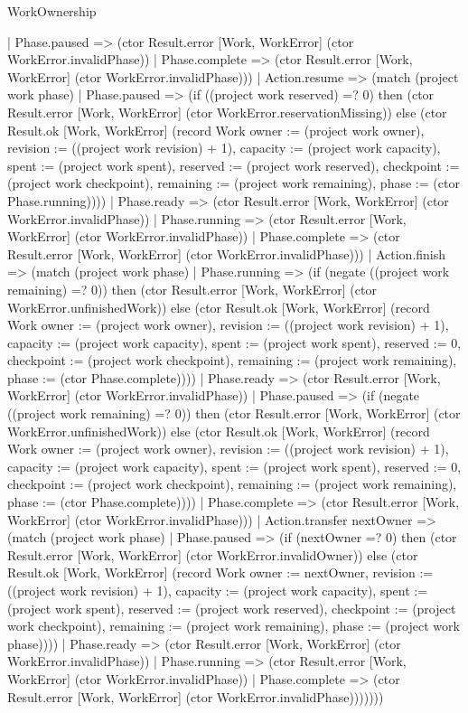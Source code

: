 \begin{lexlean}{WorkOwnership}
\begin{semanticmodule}
{      | Phase.paused => (ctor Result.error [Work, WorkError] (ctor WorkError.invalidPhase))
      | Phase.complete => (ctor Result.error [Work, WorkError] (ctor WorkError.invalidPhase)))
    | Action.resume => (match (project work phase)
      | Phase.paused => (if ((project work reserved) =? 0) then (ctor Result.error [Work, WorkError] (ctor WorkError.reservationMissing)) else (ctor Result.ok [Work, WorkError] (record Work {owner := (project work owner), revision := ((project work revision) + 1), capacity := (project work capacity), spent := (project work spent), reserved := (project work reserved), checkpoint := (project work checkpoint), remaining := (project work remaining), phase := (ctor Phase.running)})))
      | Phase.ready => (ctor Result.error [Work, WorkError] (ctor WorkError.invalidPhase))
      | Phase.running => (ctor Result.error [Work, WorkError] (ctor WorkError.invalidPhase))
      | Phase.complete => (ctor Result.error [Work, WorkError] (ctor WorkError.invalidPhase)))
    | Action.finish => (match (project work phase)
      | Phase.running => (if (negate ((project work remaining) =? 0)) then (ctor Result.error [Work, WorkError] (ctor WorkError.unfinishedWork)) else (ctor Result.ok [Work, WorkError] (record Work {owner := (project work owner), revision := ((project work revision) + 1), capacity := (project work capacity), spent := (project work spent), reserved := 0, checkpoint := (project work checkpoint), remaining := (project work remaining), phase := (ctor Phase.complete)})))
      | Phase.ready => (ctor Result.error [Work, WorkError] (ctor WorkError.invalidPhase))
      | Phase.paused => (if (negate ((project work remaining) =? 0)) then (ctor Result.error [Work, WorkError] (ctor WorkError.unfinishedWork)) else (ctor Result.ok [Work, WorkError] (record Work {owner := (project work owner), revision := ((project work revision) + 1), capacity := (project work capacity), spent := (project work spent), reserved := 0, checkpoint := (project work checkpoint), remaining := (project work remaining), phase := (ctor Phase.complete)})))
      | Phase.complete => (ctor Result.error [Work, WorkError] (ctor WorkError.invalidPhase)))
    | Action.transfer nextOwner => (match (project work phase)
      | Phase.paused => (if (nextOwner =? 0) then (ctor Result.error [Work, WorkError] (ctor WorkError.invalidOwner)) else (ctor Result.ok [Work, WorkError] (record Work {owner := nextOwner, revision := ((project work revision) + 1), capacity := (project work capacity), spent := (project work spent), reserved := (project work reserved), checkpoint := (project work checkpoint), remaining := (project work remaining), phase := (project work phase)})))
      | Phase.ready => (ctor Result.error [Work, WorkError] (ctor WorkError.invalidPhase))
      | Phase.running => (ctor Result.error [Work, WorkError] (ctor WorkError.invalidPhase))
      | Phase.complete => (ctor Result.error [Work, WorkError] (ctor WorkError.invalidPhase)))))))
}


\end{semanticmodule}
\end{lexlean}
